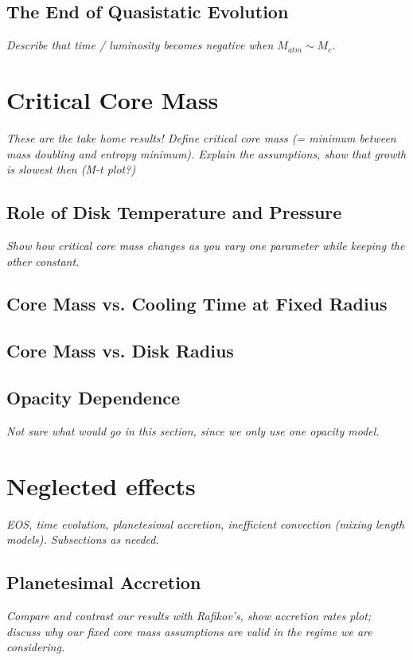 \documentclass[apj]{emulateapj}
\newcommand{\emgr}[1]{\emph{ \color{gray} #1}}
\begin{document}
\subsection{The End of Quasistatic Evolution}
\emgr{Describe that time / luminosity becomes negative when $M_{atm} \sim M_c$.}

\section{Critical Core Mass}
\emgr{These are the take home results! Define critical core mass (= minimum between mass doubling and entropy minimum). Explain the assumptions, show that growth is slowest then (M-t plot?)}

\subsection{Role of Disk Temperature and Pressure}
\emgr{Show how critical core mass changes as you vary one parameter while keeping the other constant.}

\subsection{Core Mass vs. Cooling Time at Fixed Radius}

\subsection{Core Mass vs. Disk Radius}

\subsection{Opacity Dependence}
\emgr{Not sure what would go in this section, since we only use one opacity model.}





\section{Neglected effects}
\emgr{EOS, time evolution, planetesimal accretion, inefficient convection (mixing length models).  Subsections as needed.}
\subsection{Planetesimal Accretion}
\emgr{Compare and contrast our results with Rafikov's, show accretion rates plot; discuss why our fixed core mass assumptions are valid in the regime we are considering.}
\end{document}
